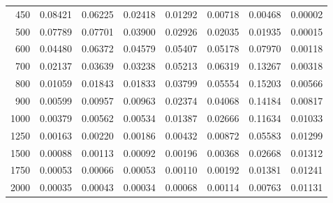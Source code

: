 \begin{table}[ht]
\begin{tabular}{r|c|c|c|c|c|c|c}
      450 & 0.08421 & 0.06225 & 0.02418 & 0.01292 & 0.00718 & 0.00468 & 0.00002 \\
      500 & 0.07789 & 0.07701 & 0.03900 & 0.02926 & 0.02035 & 0.01935 & 0.00015 \\
      600 & 0.04480 & 0.06372 & 0.04579 & 0.05407 & 0.05178 & 0.07970 & 0.00118 \\
      700 & 0.02137 & 0.03639 & 0.03238 & 0.05213 & 0.06319 & 0.13267 & 0.00318 \\
      800 & 0.01059 & 0.01843 & 0.01833 & 0.03799 & 0.05554 & 0.15203 & 0.00566 \\
      900 & 0.00599 & 0.00957 & 0.00963 & 0.02374 & 0.04068 & 0.14184 & 0.00817 \\
     1000 & 0.00379 & 0.00562 & 0.00534 & 0.01387 & 0.02666 & 0.11634 & 0.01033 \\
     1250 & 0.00163 & 0.00220 & 0.00186 & 0.00432 & 0.00872 & 0.05583 & 0.01299 \\
     1500 & 0.00088 & 0.00113 & 0.00092 & 0.00196 & 0.00368 & 0.02668 & 0.01312 \\
     1750 & 0.00053 & 0.00066 & 0.00053 & 0.00110 & 0.00192 & 0.01381 & 0.01241 \\
     2000 & 0.00035 & 0.00043 & 0.00034 & 0.00068 & 0.00114 & 0.00763 & 0.01131 \\ \cline{1-8}
    \end{tabular}
    \label{tab:XRayEffOCX2}
\end{table}

